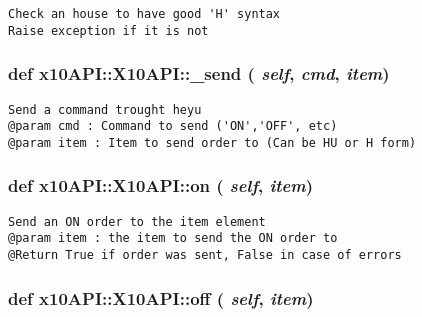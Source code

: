 \footnotesize\begin{verbatim}
Check an house to have good 'H' syntax
Raise exception if it is not
\end{verbatim}
\normalsize
 \hypertarget{classx10API_1_1X10API_268f590bc14835490b1ea823c86e4dcb}{
\subsubsection[\_\-send]{\setlength{\rightskip}{0pt plus 5cm}def x10API::X10API::\_\-send ( {\em self}, \/   {\em cmd}, \/   {\em item})}}
\label{classx10API_1_1X10API_268f590bc14835490b1ea823c86e4dcb}




\footnotesize\begin{verbatim}
Send a command trought heyu
@param cmd : Command to send ('ON','OFF', etc)
@param item : Item to send order to (Can be HU or H form)
\end{verbatim}
\normalsize
 \hypertarget{classx10API_1_1X10API_b23095bb54aa45e75857beaa59a7deed}{
\subsubsection[on]{\setlength{\rightskip}{0pt plus 5cm}def x10API::X10API::on ( {\em self}, \/   {\em item})}}
\label{classx10API_1_1X10API_b23095bb54aa45e75857beaa59a7deed}




\footnotesize\begin{verbatim}
Send an ON order to the item element
@param item : the item to send the ON order to
@Return True if order was sent, False in case of errors
\end{verbatim}
\normalsize
 \hypertarget{classx10API_1_1X10API_37be53c20aaa39f5770a5085b80984bc}{
\subsubsection[off]{\setlength{\rightskip}{0pt plus 5cm}def x10API::X10API::off ( {\em self}, \/   {\em item})}}
\label{classx10API_1_1X10API_37be53c20aaa39f5770a5085b80984bc}




